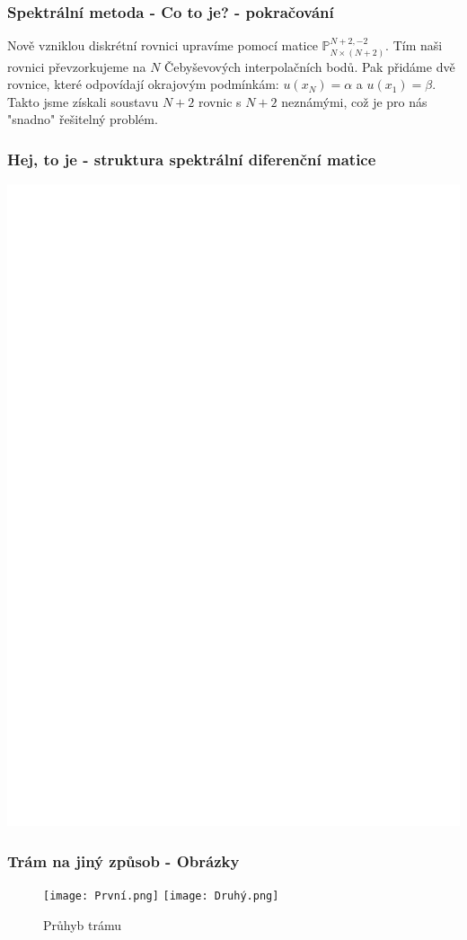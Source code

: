 \documentclass[xcolor=table]{beamer}
\begin{document}
\begin{frame}
\frametitle{Spektrální metoda - Co to je? - pokračování}
Nově vzniklou diskrétní rovnici upravíme pomocí matice $\mathbb{P}^{N+2,-2}_{N\times(N+2)}$. Tím naši rovnici převzorkujeme na $N$ Čebyševových interpolačních bodů.
\pause
Pak přidáme dvě rovnice, které odpovídají okrajovým podmínkám: $u(x_{N})=\alpha$ a $u(x_{1})=\beta$.
\pause
Takto jsme získali soustavu $N+2$ rovnic s $N+2$ neznámými, což je pro nás "snadno" řešitelný problém.
\end{frame}

\begin{frame}
\frametitle{Hej, to je - struktura spektrální diferenční matice}
\centering
\includegraphics[scale=0.5]{d-matrix-chebyshev-structure}   
\end{frame}
                
\begin{frame}
\frametitle{Trám na jiný způsob - Obrázky}
\centering
\begin{figure}
\texttt{[image: První.png]}
\texttt{[image: Druhý.png]}
\caption{Průhyb trámu}
\end{figure}
\end{frame}
\end{document}
